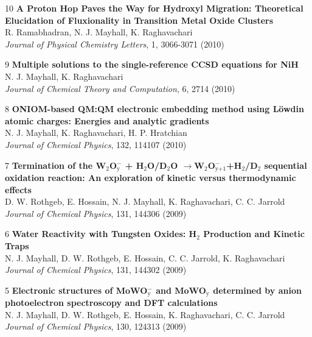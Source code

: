 \documentclass[10pt]{article}
\newenvironment{lonelist}[1][\enskip\textbullet]%
        {\vspace{-\baselineskip}\begin{list}{#1}{%
        \setlength{\partopsep}{0pt}%
        \setlength{\topsep}{0pt}}}
        {\end{list}\vspace{-.6\baselineskip}}
\begin{document}
\begin{lonelist}
\item[10\hspace{4pt}] \textbf{A Proton Hop Paves the Way for Hydroxyl Migration: Theoretical Elucidation of Fluxionality in Transition Metal Oxide Clusters}\\
R. Ramabhadran, N. J. Mayhall, K. Raghavachari\\
\textsl{Journal of Physical Chemistry Letters}, 1, 3066-3071 (2010)

\item[9\hspace{4pt}] \textbf{Multiple solutions to the single-reference CCSD equations for NiH}\\
N. J. Mayhall, K. Raghavachari\\
\textsl{Journal of Chemical Theory and Computation}, 6, 2714 (2010)

\item[8\hspace{4pt}] \textbf{ONIOM-based QM:QM electronic embedding method using L\"owdin atomic charges: Energies and analytic gradients}\\
N. J. Mayhall, K. Raghavachari, H. P. Hratchian\\
\textsl{Journal of Chemical Physics}, 132, 114107 (2010)

\item[7\hspace{4pt}] \textbf{Termination of the W$_2$O$_\text{y}^-$ + H$_2$O/D$_2$O $\rightarrow$W$_2$O$_{\text{y+1}}^-$+H$_2$/D$_2$ sequential oxidation reaction: An exploration of kinetic versus thermodynamic effects}\\
D. W. Rothgeb, E. Hossain, N. J. Mayhall, K. Raghavachari, C. C. Jarrold\\
\textsl{Journal of Chemical Physics}, 131, 144306 (2009)


\item[6\hspace{4pt}] \textbf{Water Reactivity with Tungsten Oxides: H$_2$ Production and Kinetic Traps}\\
N. J. Mayhall, D. W. Rothgeb, E. Hossain, C. C. Jarrold, K. Raghavachari\\
\textsl{Journal of Chemical Physics}, 131, 144302 (2009)


\item[5\hspace{4pt}] \textbf{Electronic structures of MoWO$_\text{y}^-$ and MoWO$_\text{y}$ determined by anion photoelectron spectroscopy and DFT calculations}\\
N. J. Mayhall, D. W. Rothgeb, E. Hossain, K. Raghavachari, C. C. Jarrold\\
\textsl{Journal of Chemical Physics}, 130, 124313 (2009)



\end{lonelist}
\end{document}

